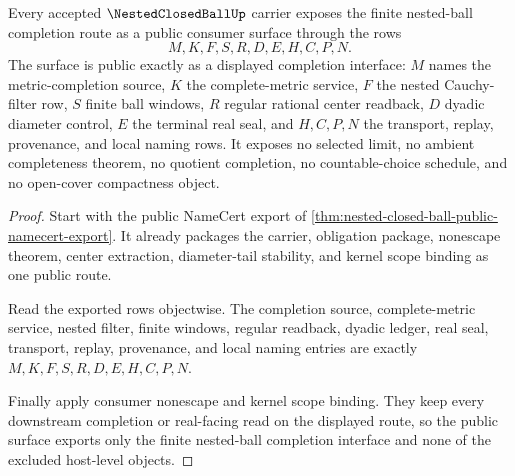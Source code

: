 \begin{theorem}
\label{thm:nested-closed-ball-public-completion-surface}
Every accepted $\NestedClosedBallUp$ carrier exposes the finite nested-ball completion route as a public consumer surface through the rows
$$
M,K,F,S,R,D,E,H,C,P,N .
$$
The surface is public exactly as a displayed completion interface: $M$ names the metric-completion source, $K$ the complete-metric service, $F$ the nested Cauchy-filter row, $S$ finite ball windows, $R$ regular rational center readback, $D$ dyadic diameter control, $E$ the terminal real seal, and $H,C,P,N$ the transport, replay, provenance, and local naming rows. It exposes no selected limit, no ambient completeness theorem, no quotient completion, no countable-choice schedule, and no open-cover compactness object.
\end{theorem}
\begin{proof}
Start with the public NameCert export of \autoref{thm:nested-closed-ball-public-namecert-export}. It already packages the carrier, obligation package, nonescape theorem, center extraction, diameter-tail stability, and kernel scope binding as one public route.

Read the exported rows objectwise. The completion source, complete-metric service, nested filter, finite windows, regular readback, dyadic ledger, real seal, transport, replay, provenance, and local naming entries are exactly $M,K,F,S,R,D,E,H,C,P,N$.

Finally apply consumer nonescape and kernel scope binding. They keep every downstream completion or real-facing read on the displayed route, so the public surface exports only the finite nested-ball completion interface and none of the excluded host-level objects.
\end{proof}

